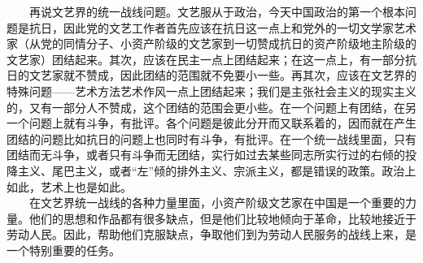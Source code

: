 \documentclass[cn,11pt,chinese]{elegantbook}
\begin{document}
　　再说文艺界的统一战线问题。文艺服从于政治，今天中国政治的第一个根本问题是抗日，因此党的文艺工作者首先应该在抗日这一点上和党外的一切文学家艺术家（从党的同情分子、小资产阶级的文艺家到一切赞成抗日的资产阶级地主阶级的文艺家）团结起来。其次，应该在民主一点上团结起来；在这一点上，有一部分抗日的文艺家就不赞成，因此团结的范围就不免要小一些。再其次，应该在文艺界的特殊问题——艺术方法艺术作风一点上团结起来；我们是主张社会主义的现实主义的，又有一部分人不赞成，这个团结的范围会更小些。在一个问题上有团结，在另一个问题上就有斗争，有批评。各个问题是彼此分开而又联系着的，因而就在产生团结的问题比如抗日的问题上也同时有斗争，有批评。在一个统一战线里面，只有团结而无斗争，或者只有斗争而无团结，实行如过去某些同志所实行过的右倾的投降主义、尾巴主义，或者“左”倾的排外主义、宗派主义，都是错误的政策。政治上如此，艺术上也是如此。\\
　　在文艺界统一战线的各种力量里面，小资产阶级文艺家在中国是一个重要的力量。他们的思想和作品都有很多缺点，但是他们比较地倾向于革命，比较地接近于劳动人民。因此，帮助他们克服缺点，争取他们到为劳动人民服务的战线上来，是一个特别重要的任务。\\
\end{document}
